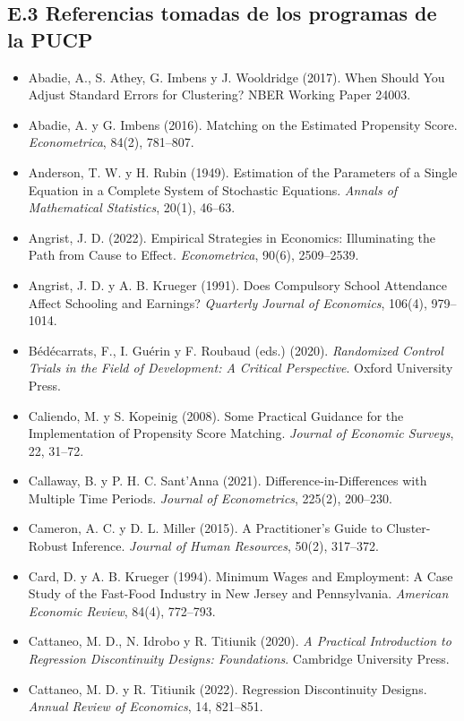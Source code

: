 \documentclass[11pt,a4paper]{article}
\begin{document}
\subsection*{E.3 Referencias tomadas de los programas de la PUCP}
{\small
\begin{itemize}[leftmargin=1.4em,itemsep=1pt,label={}]
\item Abadie, A., S. Athey, G. Imbens y J. Wooldridge (2017). When Should You Adjust Standard Errors for Clustering? NBER Working Paper 24003.
\item Abadie, A. y G. Imbens (2016). Matching on the Estimated Propensity Score. \emph{Econometrica}, 84(2), 781--807.
\item Anderson, T. W. y H. Rubin (1949). Estimation of the Parameters of a Single Equation in a Complete System of Stochastic Equations. \emph{Annals of Mathematical Statistics}, 20(1), 46--63.
\item Angrist, J. D. (2022). Empirical Strategies in Economics: Illuminating the Path from Cause to Effect. \emph{Econometrica}, 90(6), 2509--2539.
\item Angrist, J. D. y A. B. Krueger (1991). Does Compulsory School Attendance Affect Schooling and Earnings? \emph{Quarterly Journal of Economics}, 106(4), 979--1014.
\item Bédécarrats, F., I. Guérin y F. Roubaud (eds.) (2020). \emph{Randomized Control Trials in the Field of Development: A Critical Perspective}. Oxford University Press.
\item Caliendo, M. y S. Kopeinig (2008). Some Practical Guidance for the Implementation of Propensity Score Matching. \emph{Journal of Economic Surveys}, 22, 31--72.
\item Callaway, B. y P. H. C. Sant'Anna (2021). Difference-in-Differences with Multiple Time Periods. \emph{Journal of Econometrics}, 225(2), 200--230.
\item Cameron, A. C. y D. L. Miller (2015). A Practitioner's Guide to Cluster-Robust Inference. \emph{Journal of Human Resources}, 50(2), 317--372.
\item Card, D. y A. B. Krueger (1994). Minimum Wages and Employment: A Case Study of the Fast-Food Industry in New Jersey and Pennsylvania. \emph{American Economic Review}, 84(4), 772--793.
\item Cattaneo, M. D., N. Idrobo y R. Titiunik (2020). \emph{A Practical Introduction to Regression Discontinuity Designs: Foundations}. Cambridge University Press.
\item Cattaneo, M. D. y R. Titiunik (2022). Regression Discontinuity Designs. \emph{Annual Review of Economics}, 14, 821--851.

\end{itemize}}
\end{document}
